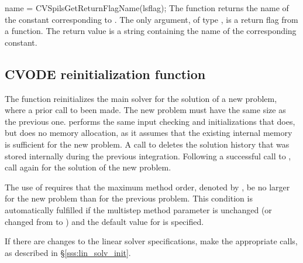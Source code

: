 {
  name = CVSpilsGetReturnFlagName(lsflag);
}
{
  The function  returns the
  name of the {\cvspils} constant corresponding to .
}
{
  The only argument, of type , is a return flag from a {\cvspils} function.
}
{
  The return value is a string containing the name of the corresponding constant.
}
{}


\subsection{CVODE reinitialization function}\label{sss:cvreinit}

The function  reinitializes the main {\cvode} solver for
the solution of a new problem, where a prior call to 
been made. The new problem must have the same size as the previous one.
 performs the same input checking and initializations 
that  does, but does no memory allocation, as it assumes that the 
existing internal memory is sufficient for the new problem.
A call to  deletes the solution history that was stored
internally during the previous integration.  Following a successful call to
, call  again for the solution of the new problem.

The use of  requires that the maximum method order, denoted by 
, be no larger for the new problem than for the previous problem.
This condition is  
automatically fulfilled if the multistep method parameter   
is unchanged (or changed from  to ) and the default    
value for  is specified.

If there are changes to the linear solver specifications, make the
appropriate  calls, as described in
\S\ref{sss:lin_solv_init}.

